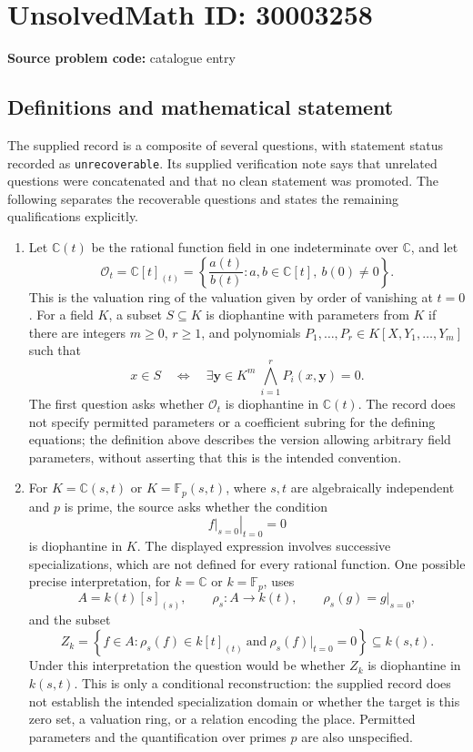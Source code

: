 \documentclass[11pt]{article}
\newcommand{\C}{\mathbb{C}}
\newcommand{\F}{\mathbb{F}}
\begin{document}
\section*{UnsolvedMath ID: 30003258}
\textbf{Source problem code:} catalogue entry
\subsection{Definitions and mathematical statement}
The supplied record is a composite of several questions, with statement status recorded as \texttt{unrecoverable}. Its supplied verification note says that unrelated questions were concatenated and that no clean statement was promoted. The following separates the recoverable questions and states the remaining qualifications explicitly.

\begin{enumerate}
\item Let \(\C(t)\) be the rational function field in one indeterminate over \(\C\), and let
\[
\mathcal O_t=\C[t]_{(t)}=\left\{\frac{a(t)}{b(t)}:a,b\in\C[t],\ b(0)\ne0\right\}.
\]
This is the valuation ring of the valuation given by order of vanishing at \(t=0\). For a field \(K\), a subset \(S\subseteq K\) is diophantine with parameters from \(K\) if there are integers \(m\ge0\), \(r\ge1\), and polynomials \(P_1,\ldots,P_r\in K[X,Y_1,\ldots,Y_m]\) such that
\[
x\in S\quad\Longleftrightarrow\quad
\exists\mathbf y\in K^m\ \bigwedge_{i=1}^{r}P_i(x,\mathbf y)=0.
\]
The first question asks whether \(\mathcal O_t\) is diophantine in \(\C(t)\). The record does not specify permitted parameters or a coefficient subring for the defining equations; the definition above describes the version allowing arbitrary field parameters, without asserting that this is the intended convention.

\item For \(K=\C(s,t)\) or \(K=\F_p(s,t)\), where \(s,t\) are algebraically independent and \(p\) is prime, the source asks whether the condition
\[
\left.\left.f\right|_{s=0}\right|_{t=0}=0
\]
is diophantine in \(K\). The displayed expression involves successive specializations, which are not defined for every rational function. One possible precise interpretation, for \(k=\C\) or \(k=\F_p\), uses
\[
A=k(t)[s]_{(s)},\qquad \rho_s:A\longrightarrow k(t),\qquad \rho_s(g)=g|_{s=0},
\]
and the subset
\[
Z_k=\left\{f\in A:\rho_s(f)\in k[t]_{(t)}\ \text{and}\ \rho_s(f)|_{t=0}=0\right\}\subseteq k(s,t).
\]
Under this interpretation the question would be whether \(Z_k\) is diophantine in \(k(s,t)\). This is only a conditional reconstruction: the supplied record does not establish the intended specialization domain or whether the target is this zero set, a valuation ring, or a relation encoding the place. Permitted parameters and the quantification over primes \(p\) are also unspecified.


\end{enumerate}
\end{document}
